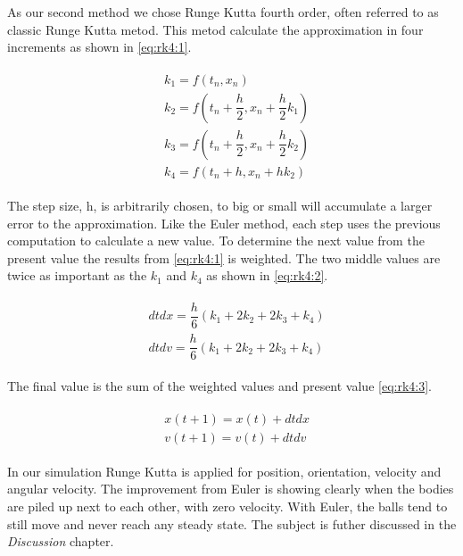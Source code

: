 \documentclass[a4paper,12pt]{report}
\begin{document}
As our second method we chose Runge Kutta fourth order, often referred to as classic Runge Kutta metod. This metod calculate the approximation in four increments as shown in \ref{eq:rk4:1}.

\begin{equation}
\begin{split}
\begin{aligned}
& k_{1} = f(t_{n}, x_{n}) \\
& k_{2} = f(t_{n}+\dfrac{h}{2}, x_{n}+\dfrac{h}{2}k_{1}) \\
& k_{3} = f(t_{n}+\dfrac{h}{2}, x_{n}+\dfrac{h}{2}k_{2}) \\
& k_{4} = f(t_{n}+h, x_{n}+hk_{2})
\end{aligned}
\end{split}
\label{eq:rk4:1}
\end{equation}

The step size, h, is arbitrarily chosen, to big or small will accumulate a larger error to the approximation. Like the Euler method, each step uses the previous computation to calculate a new value. To determine the next value from the present value the results from \ref{eq:rk4:1} is weighted. The two middle values are twice as important as the $k_1$ and $k_4$ as shown in \ref{eq:rk4:2}.

\begin{equation}
\begin{split}
\begin{aligned}
& dtdx = \dfrac{h}{6}(k_{1}+2k_{2}+2k_{3}+k_{4}) \\
& dtdv = \dfrac{h}{6}(k_{1}+2k_{2}+2k_{3}+k_{4})
\end{aligned}
\end{split}
\label{eq:rk4:2}
\end{equation}

The final value is the sum of the weighted values and present value \ref{eq:rk4:3}.

\begin{equation}
\begin{split}
\begin{aligned}
& x(t+1)=x(t)+dtdx\\
& v(t+1)=v(t)+dtdv
\end{aligned}
\end{split}
\label{eq:rk4:3}
\end{equation}

In our simulation Runge Kutta is applied for position, orientation, velocity and angular velocity. The improvement from Euler is showing clearly when the bodies are piled up next to each other, with zero velocity. With Euler, the balls tend to still move and never reach any steady state. The subject is futher discussed in the \emph{Discussion} chapter.
\end{document}
